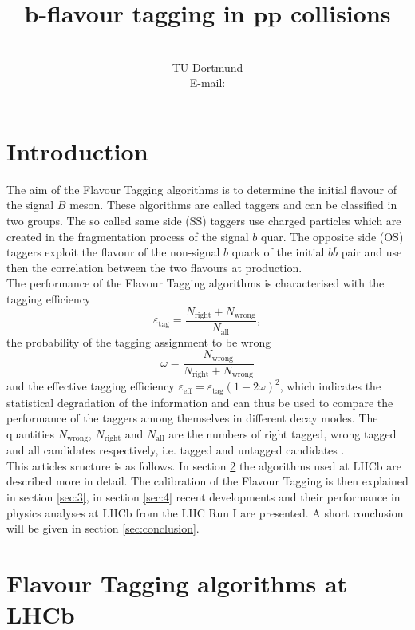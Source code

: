 \documentclass{PoS}
\title{$\bm{b}$-flavour tagging in $\bm{p\!p}$ collisions}
\author{\speaker{Alex Birnkraut}\\%
        TU Dortmund\\
        E-mail: \email{a.birnkraut@cern.ch}}
\begin{document}
\section{Introduction}\label{sec:1}

The aim of the Flavour Tagging algorithms is to determine the initial flavour of the signal $B$ meson. These algorithms are called taggers and can be classified in two groups. The so called same side (SS) taggers use charged particles which are created in the fragmentation process of the signal $b$ quar. The opposite side (OS) taggers exploit the flavour of the non-signal $b$ quark of the initial $b\bar{b}$ pair and use then the correlation between the two flavours at production.\\
The performance of the Flavour Tagging algorithms is characterised with the tagging efficiency
\begin{equation}
\varepsilon_\text{tag}=\frac{N_\text{right}+N_\text{wrong}}{N_\text{all}},
\end{equation}
the probability of the tagging assignment to be wrong
\begin{equation}
\omega=\frac{N_\text{wrong}}{N_\text{right}+N_\text{wrong}}
\end{equation}
and the effective tagging efficiency $\varepsilon_\text{eff}=\varepsilon_\text{tag}\left(1-2\omega\right)^2$, which indicates the statistical degradation of the information and can thus be used to compare the performance of the taggers among themselves in different decay modes. The quantities $N_\text{wrong}$, $N_\text{right}$ and $N_\text{all}$ are the numbers of right tagged, wrong tagged and all candidates respectively, i.e. tagged and untagged candidates \cite{1}. \\
This articles sructure is as follows. In section \ref{sec:2} the algorithms used at LHCb are described more in detail. The calibration of the Flavour Tagging is then explained in section \ref{sec:3}, in section \ref{sec:4} recent developments and their performance in physics analyses at LHCb from the LHC Run I are presented. A short conclusion will be given in section \ref{sec:conclusion}.

\section{Flavour Tagging algorithms at LHCb}\label{sec:2}
\end{document}

